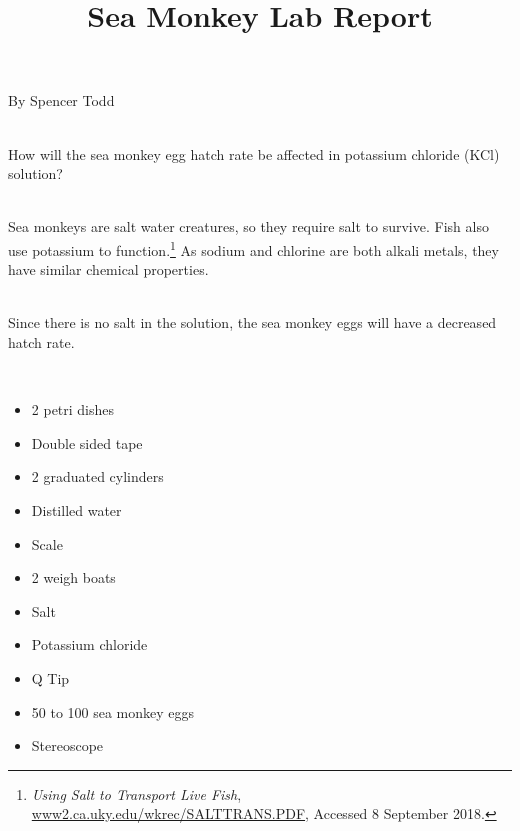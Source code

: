 \documentclass[12pt]{article}
\begin{document}
\title{Sea Monkey Lab Report}{By Spencer Todd}\double

\\
How will the sea monkey egg hatch rate be affected in potassium chloride (KCl) solution?\double

\\
Sea monkeys are salt water creatures, so they require salt to survive. Fish also use potassium to function.\footnote{\textit{Using Salt to Transport Live Fish}, \url{www2.ca.uky.edu/wkrec/SALTTRANS.PDF}, Accessed 8 September 2018.} As sodium and chlorine are both alkali metals, they have similar chemical properties.\double

\\
Since there is no salt in the solution, the sea monkey eggs will have a decreased hatch rate.\double

\\
\begin{itemize}
    \item 2 petri dishes
    \item Double sided tape
    \item 2 graduated cylinders
    \item Distilled water
    \item Scale
    \item 2 weigh boats
    \item Salt
    \item Potassium chloride
    \item Q Tip
    \item 50 to 100 sea monkey eggs
    \item Stereoscope
\end{itemize}
\end{document}

